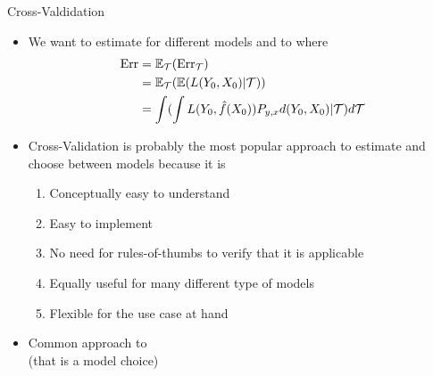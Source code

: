 \documentclass[10pt]{beamer}
\begin{document}
\begin{frame}{Cross-Valdidation}






\begin{itemize}
\item We want to estimate  for different models and to  where
\begin{align*}
\text{Err} & = \operatorname{\mathbb{E}}_\mathcal{T} (\text{Err}_\mathcal{T}) \\
 & = \operatorname{\mathbb{E}}_\mathcal{T} (\operatorname{\mathbb{E}}(L(Y_0,X_0)|\mathcal{T})) \\
& = \int (\int L(Y_0, \hat{f}(X_0)) P_{y,x} d(Y_0,X_0) |\mathcal{T}) d\mathcal{T}
\end{align*}
\item Cross-Validation is probably the most popular approach to estimate  and choose between models because it is
\begin{enumerate}
\item Conceptually easy to understand
\item Easy to implement
\item No need for rules-of-thumbs to verify that it is applicable
\item Equally useful for many different type of models
\item Flexible for the use case at hand
\end{enumerate}
\pause
\item Common approach to \\(that is a model choice)
\end{itemize}

\end{frame}
\end{document}
